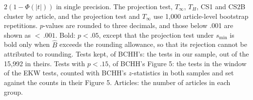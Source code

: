 \begin{table}[t]
\begin{threeparttable}
\begin{tablenotes}[flushleft]
$2(1-\Phi(|t|))$ in single precision. The projection test, $T_\infty$, $T_H$, CS1 and CS2B cluster by article, and the projection test and $T_\infty$ use 1,000 article-level bootstrap repetitions. $p$-values are rounded to three decimals, and those below .001 are shown as ${<}\,.001$. Bold: $p<.05$, except that the projection test under $s_{\min}$ is bold only when $\widehat{B}$ exceeds the rounding allowance, so that its rejection cannot be attributed to rounding. Tests kept, of BCHH's: the tests in our sample, out of the 15,992 in theirs. Tests with $p<.15$, of BCHH's Figure 5: the tests in the window of the EKW tests, counted with BCHH's $z$-statistics in both samples and set against the counts in their Figure 5. Articles: the number of articles in each group.
\end{tablenotes}
\end{threeparttable}
\end{table}
